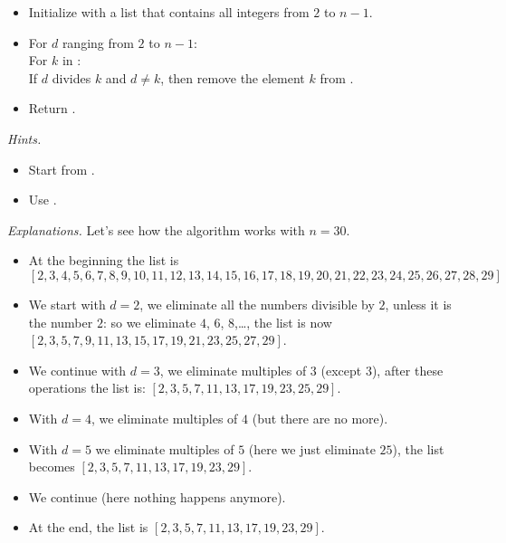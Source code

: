 \documentclass[11pt,class=report,crop=false]{standalone}
\begin{document}
\begin{activite}[Arithmetic]
\begin{enumerate}
\begin{algorithme}
\begin{itemize}
  
  \item Initialize  with a list that contains all integers from $2$ to $n-1$. 
   
   \item For $d$ ranging from $2$ to $n-1$:\\
   \indentation For $k$ in :\\
   \indentation\indentation If $d$ divides $k$ and $d \neq k$, then
remove the element $k$ from .
   \item Return .
 \end{itemize}  
 \end{algorithme}
 

  \emph{Hints.}  
  \begin{itemize}
    \item Start from .
    \item Use .
   \end{itemize} 
   
   \medskip
   
  \emph{Explanations.}
  Let's see how the algorithm works with $n=30$.
  \begin{itemize}
    \item At the beginning the list is 
    {\small$$ [2,3,4,5,6,7,8,9,10,11,12,13,14,15,16,17,18,19,20,21,22,23,24,25,26,27,28,29]$$
    }
    
    \item We start with $d=2$, we eliminate all the numbers divisible by $2$, unless it is the number $2$: so we eliminate $4$, $6$, $8$,\ldots, the list is now $[2,3,5,7,9,11,13,15,17,19,21,23,25,27,29]$.
    \item We continue with $d=3$, we eliminate multiples of $3$ (except $3$), after these operations the list is: $[2,3,5,7,11,13,17,19,23,25,29]$.
    \item With $d=4$, we eliminate multiples of $4$ (but there are no more).
    \item With $d=5$ we eliminate multiples of $5$ (here we just eliminate $25$), the list becomes $[2,3,5,7,11,13,17,19,23,29]$.
    \item We continue (here nothing happens anymore).
    
    \item At the end, the list is $[2,3,5,7,11,13,17,19,23,29]$.
  \end{itemize}
     
\end{enumerate}

\end{activite}
\end{document}
